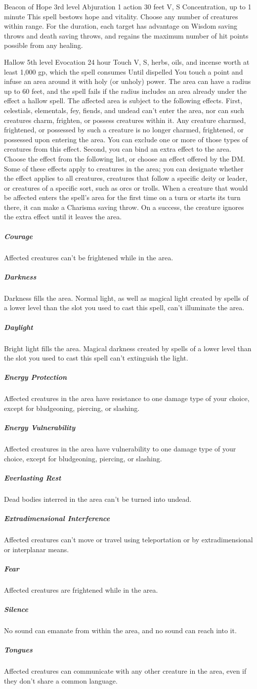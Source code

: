 \documentclass[10pt,a4paper,twoside,bg=print,twocolumn,openany,nodeprecatedcode]{dndbook}
\begin{document}
\DndSpellHeader%
{Beacon of Hope}
{3rd level Abjuration}
{1 action}
{30 feet}
{V, S}
{Concentration, up to 1 minute}
This spell bestows hope and vitality. Choose any number of creatures within range. For the duration, each target has advantage on Wisdom saving throws and death saving throws, and regains the maximum number of hit points possible from any healing.


\DndSpellHeader%
{Hallow}
{5th level Evocation}
{24 hour}
{Touch}
{V, S, herbs, oils, and incense worth at least 1,000 gp, which the spell consumes}
{Until dispelled}
You touch a point and infuse an area around it with holy (or unholy) power. The area can have a radius up to 60 feet, and the spell fails if the radius includes an area already under the effect a hallow spell. The affected area is subject to the following effects.
First, celestials, elementals, fey, fiends, and undead can't enter the area, nor can such creatures charm, frighten, or possess creatures within it. Any creature charmed, frightened, or possessed by such a creature is no longer charmed, frightened, or possessed upon entering the area. You can exclude one or more of those types of creatures from this effect.
Second, you can bind an extra effect to the area. Choose the effect from the following list, or choose an effect offered by the DM. Some of these effects apply to creatures in the area; you can designate whether the effect applies to all creatures, creatures that follow a specific deity or leader, or creatures of a specific sort, such as orcs or trolls. When a creature that would be affected enters the spell's area for the first time on a turn or starts its turn there, it can make a Charisma saving throw. On a success, the creature ignores the extra effect until it leaves the area.
\subparagraph{Courage}
Affected creatures can't be frightened while in the area.
\subparagraph{Darkness}
Darkness fills the area. Normal light, as well as magical light created by spells of a lower level than the slot you used to cast this spell, can't illuminate the area.
\subparagraph{Daylight}
Bright light fills the area. Magical darkness created by spells of a lower level than the slot you used to cast this spell can't extinguish the light.
\subparagraph{Energy Protection}
Affected creatures in the area have resistance to one damage type of your choice, except for bludgeoning, piercing, or slashing.
\subparagraph{Energy Vulnerability}
Affected creatures in the area have vulnerability to one damage type of your choice, except for bludgeoning, piercing, or slashing.
\subparagraph{Everlasting Rest}
Dead bodies interred in the area can't be turned into undead.
\subparagraph{Extradimensional Interference}
Affected creatures can't move or travel using teleportation or by extradimensional or interplanar means.
\subparagraph{Fear}
Affected creatures are frightened while in the area.
\subparagraph{Silence}
No sound can emanate from within the area, and no sound can reach into it.
\subparagraph{Tongues}
Affected creatures can communicate with any other creature in the area, even if they don't share a common language.
\end{document}
